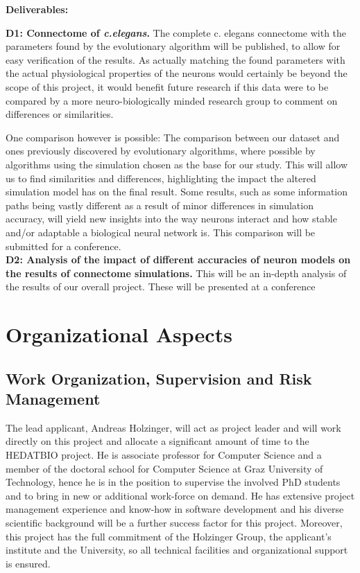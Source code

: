\documentclass[a4paper,11pt]{article}
\begin{document}
\textbf{Deliverables:} 

\textbf{D1: Connectome of \emph{c.elegans}.}
The complete c. elegans connectome with the parameters found by the evolutionary algorithm will be published, to allow for easy verification of the results. As actually matching the found parameters with the actual physiological properties of the neurons would certainly be beyond the scope of this project, it would benefit future research if this data were to be compared by a more neuro-biologically minded research group to comment on differences or similarities. 

One comparison however is possible: The comparison between our dataset and ones previously discovered by evolutionary algorithms, where possible by algorithms using the simulation chosen as the base for our study. This will allow us to find similarities and differences, highlighting the impact the altered simulation model has on the final result. Some results, such as some information paths being vastly different as a result of minor differences in simulation accuracy, will yield new insights into the way neurons interact and how stable and/or adaptable a biological neural network is. This comparison will be submitted for a conference. 
\\[0,2cm]

\textbf{D2: Analysis of the impact of different accuracies of neuron models on the results of connectome simulations.} This will be an in-depth analysis of the results of our overall project. These will be presented at a conference  


\newpage

\section{Organizational Aspects}

\subsection{Work Organization, Supervision and Risk Management}

The lead applicant, Andreas Holzinger, will act as project leader and will work directly on this project and allocate a significant amount of time to the HEDATBIO project. He is associate professor for Computer Science and a member of the doctoral school for Computer Science at Graz University of Technology, hence he is in the position to supervise the involved PhD students and to bring in new or additional work-force on demand.
He has extensive project management experience and know-how in software development and his diverse scientific background will be a further success factor for this project. Moreover, this project has the full commitment of the Holzinger Group, the applicant's institute and the University, so all technical facilities and organizational support is ensured.
\\[0,2cm]
\end{document}
